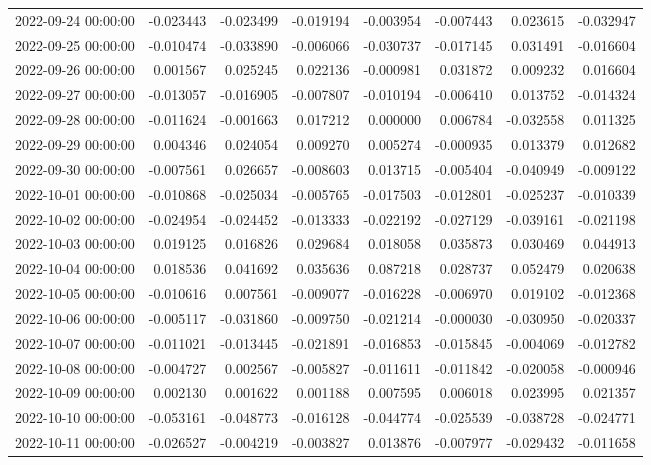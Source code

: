 \begin{tabular}{lrrrrrrr}
2022-09-24 00:00:00 & -0.023443 & -0.023499 & -0.019194 & -0.003954 & -0.007443 & 0.023615 & -0.032947 \\
2022-09-25 00:00:00 & -0.010474 & -0.033890 & -0.006066 & -0.030737 & -0.017145 & 0.031491 & -0.016604 \\
2022-09-26 00:00:00 & 0.001567 & 0.025245 & 0.022136 & -0.000981 & 0.031872 & 0.009232 & 0.016604 \\
2022-09-27 00:00:00 & -0.013057 & -0.016905 & -0.007807 & -0.010194 & -0.006410 & 0.013752 & -0.014324 \\
2022-09-28 00:00:00 & -0.011624 & -0.001663 & 0.017212 & 0.000000 & 0.006784 & -0.032558 & 0.011325 \\
2022-09-29 00:00:00 & 0.004346 & 0.024054 & 0.009270 & 0.005274 & -0.000935 & 0.013379 & 0.012682 \\
2022-09-30 00:00:00 & -0.007561 & 0.026657 & -0.008603 & 0.013715 & -0.005404 & -0.040949 & -0.009122 \\
2022-10-01 00:00:00 & -0.010868 & -0.025034 & -0.005765 & -0.017503 & -0.012801 & -0.025237 & -0.010339 \\
2022-10-02 00:00:00 & -0.024954 & -0.024452 & -0.013333 & -0.022192 & -0.027129 & -0.039161 & -0.021198 \\
2022-10-03 00:00:00 & 0.019125 & 0.016826 & 0.029684 & 0.018058 & 0.035873 & 0.030469 & 0.044913 \\
2022-10-04 00:00:00 & 0.018536 & 0.041692 & 0.035636 & 0.087218 & 0.028737 & 0.052479 & 0.020638 \\
2022-10-05 00:00:00 & -0.010616 & 0.007561 & -0.009077 & -0.016228 & -0.006970 & 0.019102 & -0.012368 \\
2022-10-06 00:00:00 & -0.005117 & -0.031860 & -0.009750 & -0.021214 & -0.000030 & -0.030950 & -0.020337 \\
2022-10-07 00:00:00 & -0.011021 & -0.013445 & -0.021891 & -0.016853 & -0.015845 & -0.004069 & -0.012782 \\
2022-10-08 00:00:00 & -0.004727 & 0.002567 & -0.005827 & -0.011611 & -0.011842 & -0.020058 & -0.000946 \\
2022-10-09 00:00:00 & 0.002130 & 0.001622 & 0.001188 & 0.007595 & 0.006018 & 0.023995 & 0.021357 \\
2022-10-10 00:00:00 & -0.053161 & -0.048773 & -0.016128 & -0.044774 & -0.025539 & -0.038728 & -0.024771 \\
2022-10-11 00:00:00 & -0.026527 & -0.004219 & -0.003827 & 0.013876 & -0.007977 & -0.029432 & -0.011658 \\

\end{tabular}
